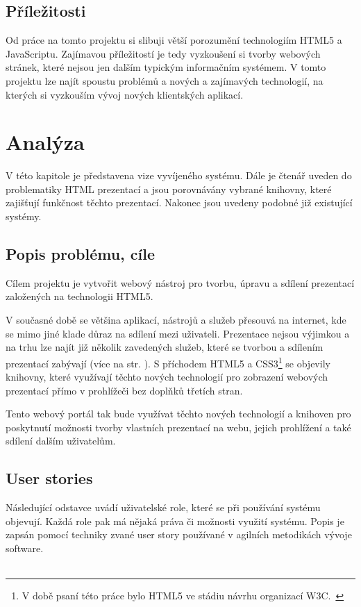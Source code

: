 \documentclass[11pt,twoside,a4paper]{book}
\newcommand*{\nom}[2]{#1 \nomenclature{#1}{#2}} 			%
\begin{document}
\section{Příležitosti}
Od práce na tomto projektu si slibuji větší porozumění technologiím HTML5 a JavaScriptu. Zajímavou příležitostí je tedy vyzkoušení si tvorby webových stránek, které nejsou jen dalším typickým informačním systémem. V tomto projektu lze najít spoustu problémů a nových a zajímavých technologií, na kterých si vyzkouším vývoj nových klientských aplikací.






\chapter{Analýza}
V této kapitole je představena vize vyvíjeného systému. Dále je čtenář uveden do problematiky \nom{HTML}{HyperText Markup Language} prezentací a jsou porovnávány vybrané knihovny, které zajišťují funkčnost těchto prezentací. Nakonec jsou uvedeny podobné již existující systémy.

\section{Popis problému, cíle}
Cílem projektu je vytvořit webový nástroj pro tvorbu, úpravu a sdílení prezentací založených na technologii HTML5.

V současné době se většina aplikací, nástrojů a služeb přesouvá na internet, kde se mimo jiné klade důraz na sdílení mezi uživateli. Prezentace nejsou výjimkou a na trhu lze najít již několik zavedených služeb, které se tvorbou a sdílením prezentací zabývají (více na str. \pageref{chap:existujiciSystemy}). S příchodem HTML5 a CSS3\footnote{V době psaní této práce bylo HTML5 ve stádiu návrhu organizací W3C.~\cite{html5-2014}} se objevily knihovny, které využívají těchto nových technologií pro zobrazení webových prezentací přímo v prohlížeči bez doplňků třetích stran.

Tento webový portál tak bude využívat těchto nových technologií a knihoven pro poskytnutí možnosti tvorby vlastních prezentací na webu, jejich prohlížení a také sdílení dalším uživatelům.


\section{User stories}\label{chap:userstory}
Následující odstavce uvádí uživatelské role, které se při používání systému objevují. Každá role pak má nějaká práva či možnosti využití systému. Popis je zapsán pomocí techniky zvané user story používané v agilních metodikách vývoje software. \\\\
\end{document}
